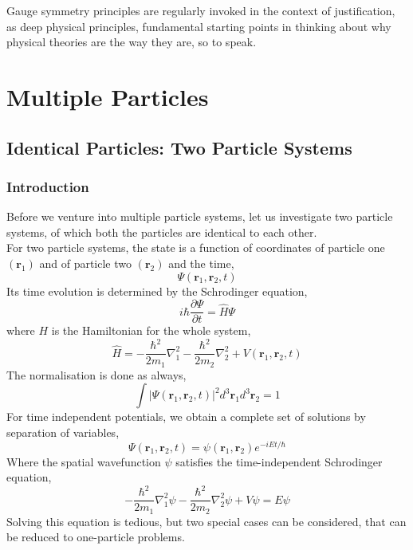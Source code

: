 \begin{savequote}[45mm]
Gauge symmetry principles are regularly invoked in the context of justification, as deep physical principles, fundamental starting points in thinking about why physical theories are the way they are, so to speak.  
\end{savequote}
\chapter{Multiple Particles}
\label{ch:multiple_particles}
\section{Identical Particles: Two Particle Systems}
\subsection{Introduction}
Before we venture into multiple particle systems, let us investigate two particle systems, of which both the particles are identical to each other.\\
For two particle systems, the state is a function of coordinates of particle one $(\textbf{r}_1)$ and of particle two $(\textbf{r}_2)$ and the time,
\begin{equation}
    \Psi(\textbf{r}_1,\textbf{r}_2,t)
\end{equation}
Its time evolution is determined by the Schrodinger equation,
\begin{equation}
    i\hbar\frac{\partial \Psi}{\partial t}=\hat{H}\Psi
\end{equation}
where $H$ is the Hamiltonian for the whole system,
\begin{equation}
    \hat{H}=-\frac{\hbar^2}{2m_1}\nabla^2_1-\frac{\hbar^2}{2m_2}\nabla^2_2+V(\textbf{r}_1,\textbf{r}_2,t)
\end{equation}
The normalisation is done as always,
\begin{equation}
    \int\vert \Psi(\textbf{r}_1,\textbf{r}_2,t)\vert^2d^3\textbf{r}_1d^3\textbf{r}_2=1
\end{equation}
For time independent potentials, we obtain a complete set of solutions by separation of variables,
\begin{equation}
    \Psi(\textbf{r}_1,\textbf{r}_2,t)=\psi(\textbf{r}_1,\textbf{r}_2)e^{-iEt/\hbar}
\end{equation}
Where the spatial wavefunction $\psi$ satisfies the time-independent Schrodinger equation,
\begin{equation}
    -\frac{\hbar^2}{2m_1}\nabla^2_1\psi-\frac{\hbar^2}{2m_2}\nabla^2_2\psi+V\psi=E\psi
\end{equation}
Solving this equation is tedious, but two special cases can be considered, that can be reduced to one-particle problems.
